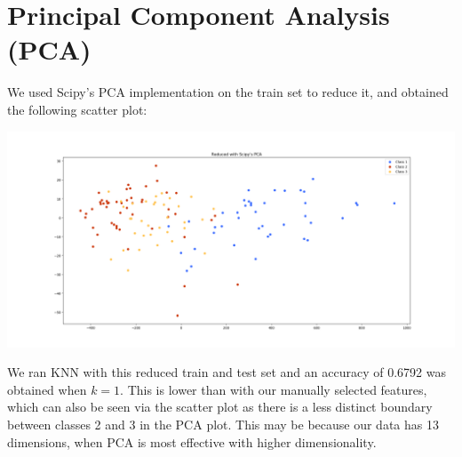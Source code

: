 \documentclass[11pt]{article}
\begin{document}
\section{Principal Component Analysis (PCA)}
We used Scipy's PCA implementation on the train set to reduce it, and obtained the following scatter plot:
\begin{center}
\includegraphics[scale=0.25]{pca_scatter_graph}
\end{center}

We ran KNN with this reduced train and test set and an accuracy of 0.6792 was obtained when $k = 1$. This is lower than with our manually selected features, which can also be seen via the scatter plot as there is a less distinct boundary between classes 2 and 3 in the PCA plot. This may be because our data has 13 dimensions, when PCA is most effective with higher dimensionality.
\end{document}
